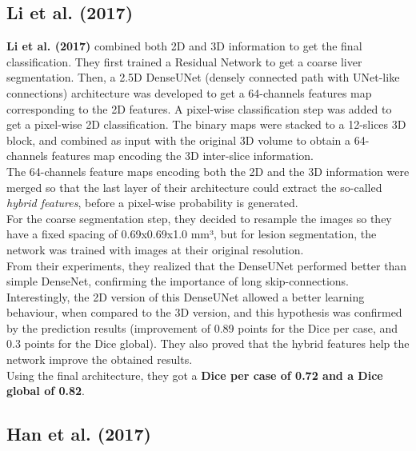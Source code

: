 \subsection*{Li et al. (2017)}\label{li-et-al.-2017}

\textbf{Li et al. (2017)} combined both 2D and 3D information to get the
final classification. They first trained a Residual Network to get a
coarse liver segmentation. Then, a 2.5D DenseUNet (densely connected
path with UNet-like connections) architecture was developed to get a
64-channels features map corresponding to the 2D features. A pixel-wise
classification step was added to get a pixel-wise 2D classification. The
binary maps were stacked to a 12-slices 3D block, and combined as input
with the original 3D volume to obtain a 64-channels features map
encoding the 3D inter-slice information.\\
The 64-channels feature maps encoding both the 2D and the 3D information
were merged so that the last layer of their architecture could extract
the so-called \emph{hybrid features}, before a pixel-wise probability is
generated.\\
For the coarse segmentation step, they decided to resample the images so
they have a fixed spacing of 0.69x0.69x1.0 mm³, but for lesion
segmentation, the network was trained with images at their original
resolution.\\
From their experiments, they realized that the DenseUNet performed
better than simple DenseNet, confirming the importance of long
skip-connections. Interestingly, the 2D version of this DenseUNet
allowed a better learning behaviour, when compared to the 3D version,
and this hypothesis was confirmed by the prediction results (improvement
of 0.89 points for the Dice per case, and 0.3 points for the Dice
global). They also proved that the hybrid features help the network
improve the obtained results.\\
Using the final architecture, they got a \textbf{Dice per case of 0.72
and a Dice global of 0.82}.

\subsection*{Han et al. (2017)}\label{han-et-al.-2017}

